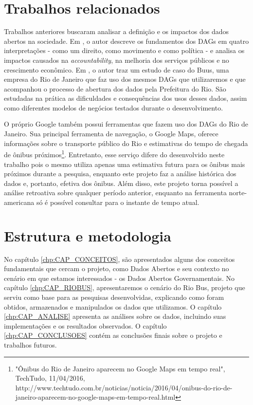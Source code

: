 \section{Trabalhos relacionados}\label{sec:CAP_INTRO_TRABALHOS_RELACIONADOS}

Trabalhos anteriores buscaram analisar a definição e os impactos dos dados abertos na sociedade. Em \cite{REF_OGD_AND_IMPACT}, o autor descreve os fundamentos dos DAGs em quatro interpretações - como um direito, como movimento e como política - e analisa os impactos causados na \textit{accountability}, na melhoria dos serviços públicos e no crescimento econômico. Em \cite{REF_MONO_BUUS}, o autor traz um estudo de caso do Buus, uma empresa do Rio de Janeiro que faz uso dos mesmos DAGs que utilizaremos e que acompanhou o processo de abertura dos dados pela Prefeitura do Rio. São estudadas na prática as dificuldades e consequências dos usos desses dados, assim como diferentes modelos de negócios testados durante o desenvolvimento.

O próprio Google também possui ferramentas que fazem uso dos DAGs do Rio de Janeiro. Sua principal ferramenta de navegação, o Google Maps, oferece informações sobre o transporte público do Rio e estimativas do tempo de chegada de ônibus próximos\footnote{"Ônibus do Rio de Janeiro aparecem no Google Maps em tempo real", TechTudo, 11/04/2016,  http://www.techtudo.com.br/noticias/noticia/2016/04/onibus-do-rio-de-janeiro-aparecem-no-google-maps-em-tempo-real.html}. Entretanto, esse serviço difere do desenvolvido neste trabalho pois o mesmo utiliza apenas uma estimativa futura para os ônibus mais próximos durante a pesquisa, enquanto este projeto faz a análise histórica dos dados e, portanto, efetiva dos ônibus. Além disso, este projeto torna possível a análise retroativa sobre qualquer período anterior, enquanto na ferramenta norte-americana só é possível consultar para o instante de tempo atual.


\section{Estrutura e metodologia}\label{sec:CAP_INTRO_ESTRUTURA}

No capítulo \ref{chp:CAP_CONCEITOS}, são apresentados alguns dos conceitos fundamentais que cercam o projeto, como Dados Abertos e seu contexto no cenário em que estamos interessados - os Dados Abertos Governamentais. No capítulo \ref{chp:CAP_RIOBUS}, apresentaremos o cenário do Rio Bus, projeto que serviu como base para as pesquisas desenvolvidas, explicando como foram obtidos, armazenados e manipulados os dados que utilizamos. O capítulo \ref{chp:CAP_ANALISE} apresenta as análises sobre os dados, incluindo suas implementações e os resultados observados. O capítulo \ref{chp:CAP_CONCLUSOES} contém as conclusões finais sobre o projeto e trabalhos futuros.